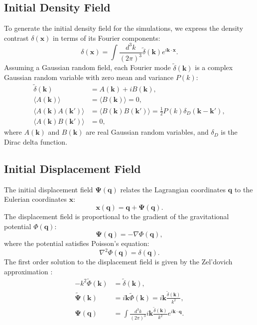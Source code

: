 \subsection{Initial Density Field}
To generate the initial density field for the simulations, we express the density contrast $\delta(\mathbf{x})$ in terms of its Fourier components:
\begin{equation}
    \delta(\mathbf{x}) = \int \frac{d^3k}{(2\pi)^3} \tilde{\delta}(\mathbf{k}) e^{i\mathbf{k} \cdot \mathbf{x}}.
\end{equation}
Assuming a Gaussian random field, each Fourier mode $\tilde{\delta}(\mathbf{k})$ is a complex Gaussian random variable with zero mean and variance $P(k)$:
\begin{align}
    \tilde{\delta}(\mathbf{k}) &= A(\mathbf{k}) + i B(\mathbf{k}), \\
    \langle A(\mathbf{k}) \rangle &= \langle B(\mathbf{k}) \rangle = 0, \\
    \langle A(\mathbf{k}) A(\mathbf{k}') \rangle &= \langle B(\mathbf{k}) B(\mathbf{k}') \rangle = \frac{1}{2} P(k) \delta_D(\mathbf{k} - \mathbf{k}'), \\
    \langle A(\mathbf{k}) B(\mathbf{k}') \rangle &= 0,
\end{align}
where $A(\mathbf{k})$ and $B(\mathbf{k})$ are real Gaussian random variables, and $\delta_D$ is the Dirac delta function.

\subsection{Initial Displacement Field}
The initial displacement field $\boldsymbol{\Psi}(\mathbf{q})$ relates the Lagrangian coordinates $\mathbf{q}$ to the Eulerian coordinates $\mathbf{x}$:
\begin{equation}
    \mathbf{x}(\mathbf{q}) = \mathbf{q} + \boldsymbol{\Psi}(\mathbf{q}).
\end{equation}
The displacement field is proportional to the gradient of the gravitational potential $\Phi(\mathbf{q})$:
\begin{equation}
    \boldsymbol{\Psi}(\mathbf{q}) = - \nabla \Phi(\mathbf{q}),
\end{equation}
where the potential satisfies Poisson's equation:
\begin{equation}
    \nabla^2 \Phi(\mathbf{q}) = \delta(\mathbf{q}).
\end{equation}
The first order solution to the displacement field is given by the Zel'dovich approximation \citep{1970A&A.....5...84Z}:
\begin{align}
    -k^2 \tilde{\Phi}(\mathbf{k}) &= \tilde{\delta}(\mathbf{k}), \\
    \tilde{\boldsymbol{\Psi}}(\mathbf{k}) &= i \mathbf{k} \tilde{\Phi}(\mathbf{k}) = i \mathbf{k} \frac{\tilde{\delta}(\mathbf{k})}{k^2}, \\
    \boldsymbol{\Psi}(\mathbf{q}) &= \int \frac{d^3k}{(2\pi)^3} i \mathbf{k} \frac{\tilde{\delta}(\mathbf{k})}{k^2} e^{i\mathbf{k} \cdot \mathbf{q}}.
\end{align}

